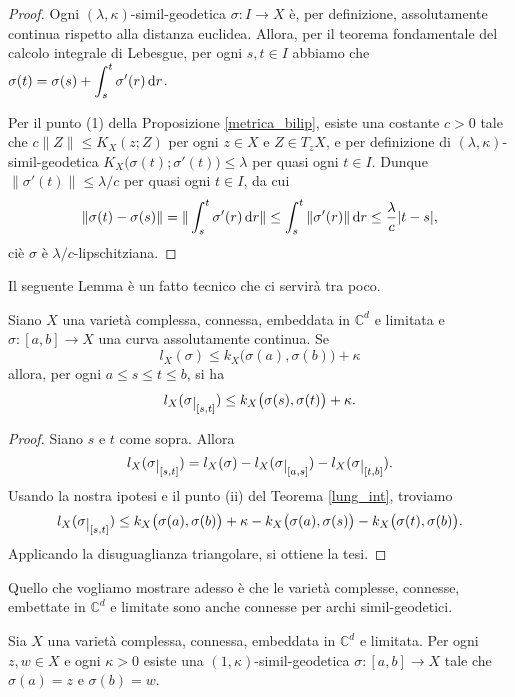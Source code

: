 \begin{proof}
    Ogni $(\lambda,\kappa)$-simil-geodetica $\sigma:I\longrightarrow X$ è, per definizione, assolutamente continua rispetto alla distanza euclidea. Allora, per il teorema fondamentale del calcolo integrale di Lebesgue, per ogni $s,t\in I$ abbiamo che $\displaystyle\sigma(t)=\sigma(s)+\int_s^t\sigma'(r)\mathop{}\!\mathrm{d} r$.
    
    Per il punto (1) della Proposizione \ref{metrica_bilip}, esiste una costante $c>0$ tale che $c\|Z\| \le K_X(z;Z)$ per ogni $z\in X$ e $Z\in T_zX$, e per definizione di $(\lambda,\kappa)$-simil-geodetica $K_X\big(\sigma(t);\sigma'(t)\big) \le \lambda$ per quasi ogni $t\in I$. Dunque $\|\sigma'(t)\| \le \lambda/c$ per quasi ogni $t\in I$, da cui
    $$\|\sigma(t)-\sigma(s)\| =\|\int_s^t\sigma'(r)\mathop{}\!\mathrm{d} r\| \le \int_s^t\|\sigma'(r)\|\mathop{}\!\mathrm{d} r \le \frac{\lambda}{c}|t-s|,$$
    ciè $\sigma$ è $\lambda/c$-lipschitziana.
\end{proof}

Il seguente Lemma è un fatto tecnico che ci servirà tra poco.

\begin{lm} \label{restrdis}
    Siano $X$ una varietà complessa, connessa, embeddata in $\mathbb{C}^d$ e limitata e $\sigma:[a,b] \longrightarrow X$ una curva assolutamente continua. Se
    $$l_X(\sigma) \le k_X\big(\sigma(a),\sigma(b)\big)+\kappa$$
    allora, per ogni $a \le s \le t \le b$, si ha
    $$l_X(\sigma\restrict{[s,t]}) \le k_X\big(\sigma(s),\sigma(t)\big)+\kappa.$$
\end{lm}

\begin{proof}
    Siano $s$ e $t$ come sopra. Allora
    $$l_X(\sigma\restrict{[s,t]})=l_X(\sigma)-l_X(\sigma\restrict{[a,s]})-l_X(\sigma\restrict{[t,b]}).$$
    Usando la nostra ipotesi e il punto (ii) del Teorema \ref{lung_int}, troviamo
    $$l_X(\sigma\restrict{[s,t]}) \le k_X\big(\sigma(a),\sigma(b)\big)+\kappa-k_X\big(\sigma(a),\sigma(s)\big)-k_X\big(\sigma(t),\sigma(b)\big).$$
    Applicando la disuguaglianza triangolare, si ottiene la tesi.
\end{proof}

Quello che vogliamo mostrare adesso è che le varietà complesse, connesse, embettate in $\mathbb{C}^d$ e limitate sono anche connesse per archi simil-geodetici.

\begin{thm} \label{similgeo_conn}
    Sia $X$ una varietà complessa, connessa, embeddata in $\mathbb{C}^d$ e limitata. Per ogni $z,w \in X$ e ogni $\kappa>0$ esiste una $(1,\kappa)$-simil-geodetica $\sigma:[a,b]\longrightarrow X$ tale che $\sigma(a)=z$ e $\sigma(b)=w$.
\end{thm}

